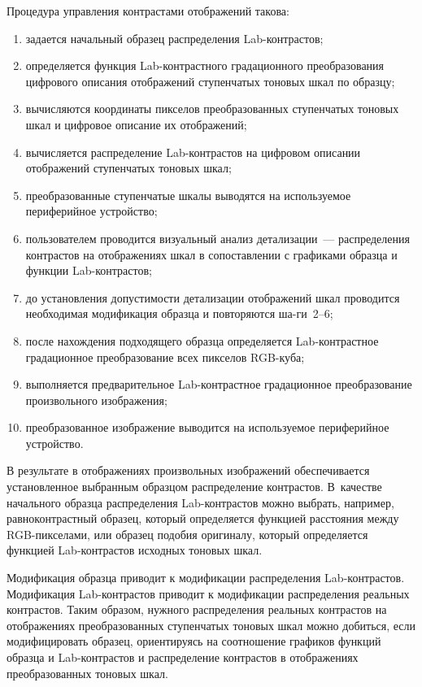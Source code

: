 \begin{multicols}{2}
  Процедура управления контрастами отображений такова:
  \begin{enumerate}[(1)]
\item задается начальный образец распределения Lab-конт\-рас\-тов;
\item определяется функция Lab-конт\-раст\-но\-го градационного 
преобразования цифрового описания отображений ступенчатых тоновых шкал 
по образцу;
\item вычисляются координаты пикселов преобразованных ступенчатых 
тоновых шкал и цифровое описание их отображений; 
\item вычисляется распределение Lab-конт\-рас\-тов на цифровом описании 
отображений ступенчатых тоновых шкал;
\item преобразованные ступенчатые шкалы выводятся на используемое 
периферийное устройство;
\item пользователем проводится визуальный анализ детализации~--- 
распределения контрастов на отображениях шкал в сопоставлении с графиками 
образца и функции Lab-конт\-рас\-тов;
\item до установления допустимости детализации отображений шкал 
проводится необходимая модификация образца и повторяются ша-\linebreak ги~2--6;
\item после нахождения подходящего образца определяется Lab-конт\-раст\-ное 
градационное преобразование всех пикселов RGB-ку\-ба;
\item выполняется предварительное Lab-конт\-раст\-ное градационное 
преобразование произвольного изображения;
\item преобразованное изображение выводится на используемое периферийное 
устройство.
\end{enumerate}

  В результате в отображениях произвольных изоб\-ражений обеспечивается 
установленное выбранным образцом распределение контрастов. В~качестве 
начального образца распределения Lab-конт\-рас\-тов можно выбрать, 
например, равноконтрастный образец, который определяется функцией 
расстояния между RGB-пик\-се\-ла\-ми, или образец подобия оригиналу, 
который определяется функцией Lab-конт\-рас\-тов исходных тоновых шкал.
  
  Модификация образца приводит к модификации распределения 
  Lab-конт\-рас\-тов. Модификация Lab-конт\-рас\-тов приводит к 
модификации распределения реальных контрастов. Таким образом, нужного 
распределения реальных контрастов на отображениях преобразованных 
ступенчатых тоновых шкал можно добиться, если модифицировать образец, 
ориентируясь на соотношение графиков функций образца и Lab-конт\-рас\-тов 
и распределение контрастов в отображениях преобразованных тоновых шкал.
  

\end{multicols}
